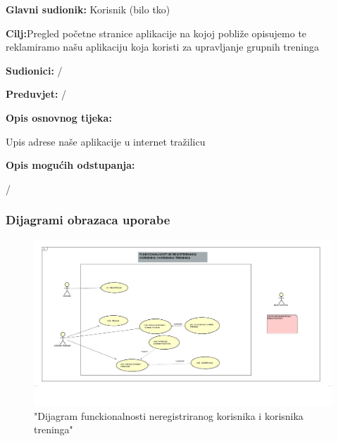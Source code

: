    			    
   			    \begin{packed_item}
   			    	
   			    	\item \textbf{Glavni sudionik: }Korisnik (bilo tko)
   			    	\item  \textbf{Cilj:}Pregled početne stranice aplikacije na kojoj pobliže opisujemo te reklamiramo našu aplikaciju koja koristi za upravljanje grupnih treninga 
   			    	\item  \textbf{Sudionici:} /
   			    	\item  \textbf{Preduvjet:} /
   			    	\item  \textbf{Opis osnovnog tijeka:}
   			    	
   			    	\item[] \begin{packed_enum}
   			    		
   			    		\item Upis adrese naše aplikacije u internet tražilicu
   			    		
   			    	\end{packed_enum}
   			    	
   			    	\item  \textbf{Opis mogućih odstupanja:}
   			    	
   			    	\begin{packed_enum}
   			    		
   			    		\item /
   			    		
   			    	\end{packed_enum}
   			    	
   			    \end{packed_item}
				\subsubsection{Dijagrami obrazaca uporabe}
					
						\begin{figure}[H]
						\includegraphics[scale=0.5]{dijagrami/nestodrugo.png} %
						\centering
						\caption{"Dijagram funckionalnosti neregistriranog korisnika i korisnika treninga"}
						\label{fig:ou1}
				     	\end{figure}
			     	
